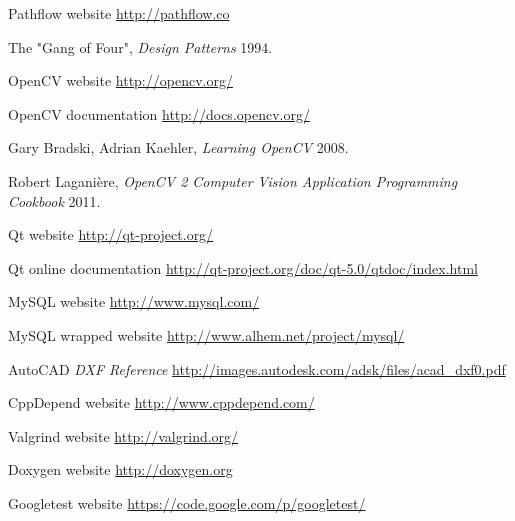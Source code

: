 \begin{thebibliography}{1}

 Pathflow website \url{http://pathflow.co}

 The "Gang of Four", \textit{Design Patterns} 1994.

 OpenCV website \url{http://opencv.org/}

 OpenCV documentation \url{http://docs.opencv.org/}

 Gary Bradski, Adrian Kaehler, {\em Learning OpenCV} 2008.

 Robert Laganière, {\em OpenCV 2 Computer Vision Application Programming Cookbook} 2011.

 Qt website \url{http://qt-project.org/}

 Qt online documentation \url{http://qt-project.org/doc/qt-5.0/qtdoc/index.html}

 MySQL website \url{http://www.mysql.com/}

 MySQL wrapped website \url{http://www.alhem.net/project/mysql/}

 AutoCAD {\em DXF Reference} \url{http://images.autodesk.com/adsk/files/acad_dxf0.pdf}

 CppDepend website \url{http://www.cppdepend.com/}

 Valgrind website \url{http://valgrind.org/}

 Doxygen website \url{http://doxygen.org}

 Googletest website \url{https://code.google.com/p/googletest/}

\bibitem{}
\end{thebibliography}